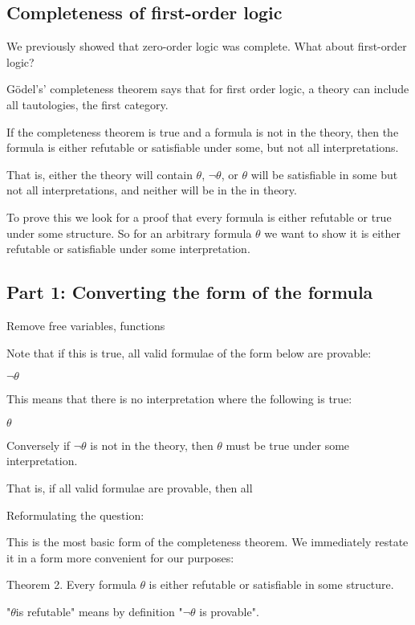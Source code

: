 

\subsection{Completeness of first-order logic}

We previously showed that zero-order logic was complete. What about first-order logic?

G{\"o}del’s’ completeness theorem says that for first order logic, a theory can include all tautologies, the first category.

If the completeness theorem is true and a formula is not in the theory, then the formula is either refutable or satisfiable under some, but not all interpretations.

That is, either the theory will contain \(\theta \), \(\neg \theta \), or \(\theta \) will be satisfiable in some but not all interpretations, and neither will be in the in theory.

To prove this we look for a proof that every formula is either refutable or true under some structure. So for an arbitrary formula \(\theta \) we want to show it is either refutable or satisfiable under some interpretation.

\subsection{Part 1: Converting the form of the formula}

Remove free variables, functions

Note that if this is true, all valid formulae of the form below are provable:

\(\neg \theta \)

This means that there is no interpretation where the following is true:

\(\theta \)

Conversely if \(\neg \theta \) is not in the theory, then \(\theta \) must be true under some interpretation.

That is, if all valid formulae are provable, then all

Reformulating the question:

This is the most basic form of the completeness theorem. We immediately restate it in a form more convenient for our purposes:

Theorem 2. Every formula \(\theta \) is either refutable or satisfiable in some structure.

"\(\theta \)is refutable" means by definition "\(\neg \theta \) is provable".

